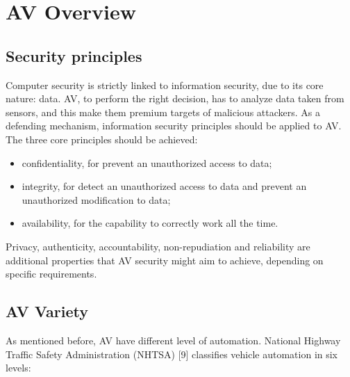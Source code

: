 \section{AV Overview}
\subsection{Security principles}
    Computer security is strictly linked to information security, due  to  its  core  nature:  data. AV, to perform the right decision, has to analyze data taken from sensors, and this make them premium targets of malicious attackers. As a defending mechanism, information security principles should be applied to AV. The three core 
    principles should be achieved:
    \begin{itemize}
        \item confidentiality, for prevent an unauthorized access to data;
        
        \item integrity, for detect an unauthorized access to data and prevent an unauthorized modification to data;
        
        \item availability, for the capability to correctly work all the time.
    \end{itemize}
    Privacy, authenticity, accountability, non-repudiation and reliability are additional properties that AV security might aim to achieve, depending on specific requirements.

\subsection{AV Variety}
    As mentioned before, AV have different level of automation. National Highway Traffic Safety Administration (NHTSA) [9] classifies vehicle automation in six levels:
    
